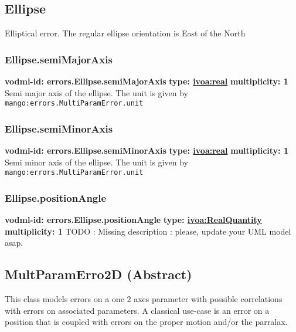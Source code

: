   \subsection{Ellipse}
  \label{sect:errors.Ellipse}
    Elliptical error. The regular ellipse orientation is East of the North

    \subsubsection{Ellipse.semiMajorAxis}
      \textbf{vodml-id: errors.Ellipse.semiMajorAxis} \newline
      \textbf{type: \hyperref[sect:ivoa]{ivoa:real}} \newline
      \textbf{multiplicity: 1} \newline 
      Semi major axis of the ellipse. The unit is given by \texttt{mango:errors.MultiParamError.unit}

    \subsubsection{Ellipse.semiMinorAxis}
      \textbf{vodml-id: errors.Ellipse.semiMinorAxis} \newline
      \textbf{type: \hyperref[sect:ivoa]{ivoa:real}} \newline
      \textbf{multiplicity: 1} \newline 
      Semi minor axis of the ellipse. The unit is given by \texttt{mango:errors.MultiParamError.unit}

    \subsubsection{Ellipse.positionAngle}
      \textbf{vodml-id: errors.Ellipse.positionAngle} \newline
      \textbf{type: \hyperref[sect:ivoa]{ivoa:RealQuantity}} \newline
      \textbf{multiplicity: 1} \newline 
      TODO : Missing description : please, update your UML model asap.

  \subsection{MultParamErro2D (Abstract)}
  \label{sect:errors.MultParamErro2D}
    This class models errors on a one 2 axes parameter with possible correlations with errors on associated parameters. A classical use-case is an error on a position that is coupled with errors on the proper motion and/or the parralax.

